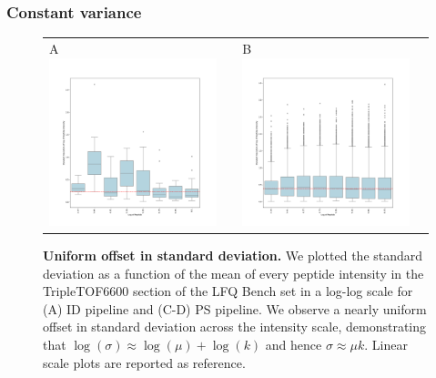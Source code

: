 \documentclass[11pt]{article}
\begin{document}
\subsubsection*{Constant variance}
\begin{figure}[hbt]
    \centering
    \centering
    \begin{tabular}{lclc} 
        A \includegraphics[width=0.5\linewidth]{../../result/report_plots_pipeline/quantile_bins_ID_median.png} & &
        B \includegraphics[width=0.5\linewidth]{../../result/report_plots_pipeline/quantile_bins_PS_median.png} & \\
    \end{tabular}
  \caption{{\bf Uniform offset in standard deviation.} We plotted the standard deviation as a function of the mean of every peptide intensity in the TripleTOF6600 section of the LFQ Bench set  in a log-log scale for (A) ID pipeline and (C-D) PS pipeline.  We observe a nearly uniform offset in standard deviation across the intensity scale, demonstrating that $\log(\sigma) \approx \log(\mu) + \log(k)$ and hence   $\sigma \approx \mu k$. Linear scale plots are reported as reference.  \label{fig:uniform_offset_in_standard_deviation_boxplot}}
\end{figure}
\end{document}
